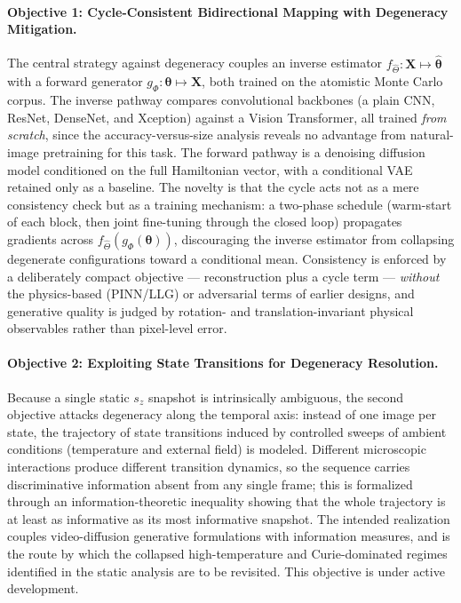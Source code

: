 \documentclass[letterpaper, 12, one column]{article}
\begin{document}
\paragraph{Objective 1: Cycle-Consistent Bidirectional Mapping with Degeneracy Mitigation.}
The central strategy against degeneracy couples an inverse estimator $f_{\hat{\Theta}}:\mathbf{X}\mapsto\hat{\boldsymbol{\theta}}$ with a forward generator $g_{\Phi}:\boldsymbol{\theta}\mapsto\mathbf{X}$, both trained on the atomistic Monte Carlo corpus. The inverse pathway compares convolutional backbones (a plain CNN, ResNet, DenseNet, and Xception) against a Vision Transformer, all trained \emph{from scratch}, since the accuracy-versus-size analysis reveals no advantage from natural-image pretraining for this task. The forward pathway is a denoising diffusion model conditioned on the full Hamiltonian vector, with a conditional VAE retained only as a baseline. The novelty is that the cycle acts not as a mere consistency check but as a training mechanism: a two-phase schedule (warm-start of each block, then joint fine-tuning through the closed loop) propagates gradients across $f_{\hat{\Theta}}(g_{\Phi}(\boldsymbol{\theta}))$, discouraging the inverse estimator from collapsing degenerate configurations toward a conditional mean. Consistency is enforced by a deliberately compact objective --- reconstruction plus a cycle term --- \emph{without} the physics-based (PINN/LLG) or adversarial terms of earlier designs, and generative quality is judged by rotation- and translation-invariant physical observables rather than pixel-level error.

\paragraph{Objective 2: Exploiting State Transitions for Degeneracy Resolution.}
Because a single static $s_z$ snapshot is intrinsically ambiguous, the second objective attacks degeneracy along the temporal axis: instead of one image per state, the trajectory of state transitions induced by controlled sweeps of ambient conditions (temperature and external field) is modeled. Different microscopic interactions produce different transition dynamics, so the sequence carries discriminative information absent from any single frame; this is formalized through an information-theoretic inequality showing that the whole trajectory is at least as informative as its most informative snapshot. The intended realization couples video-diffusion generative formulations with information measures, and is the route by which the collapsed high-temperature and Curie-dominated regimes identified in the static analysis are to be revisited. This objective is under active development.
\end{document}
